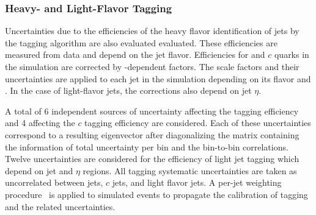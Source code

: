 
\subsubsection{Heavy- and Light-Flavor Tagging}
\label{sec:syst_btag}
Uncertainties due to the efficiencies of the heavy flavor identification
of jets by the \bt tagging algorithm are also evaluated evaluated.
These efficiencies are measured from data and depend on the jet flavor.
Efficiencies for \bt and $c$ quarks in the simulation are corrected by 
\pt-dependent factors. The scale factors and their uncertainties
are applied to each jet in the simulation depending on its flavor and \pt. 
In the case of light-flavor jets, the corrections also depend on jet $\eta$.

A total of 6 independent sources of uncertainty affecting the \bt tagging efficiency
and 4 affecting the $c$ tagging efficiency are considered. Each
of these uncertainties correspond to a resulting eigenvector after
diagonalizing the matrix containing the information of total
uncertainty per \pt bin and the bin-to-bin correlations. Twelve uncertainties are 
considered for the efficiency of light jet tagging which depend on jet \pt and $\eta$ regions.
All \bt tagging systematic uncertainties are taken as uncorrelated between \bt jets,
$c$ jets, and light flavor jets. %
A per-jet weighting procedure~\cite{IFAEBtagNote} is applied to simulated events to propagate the calibration of \bt tagging
and the related uncertainties.

